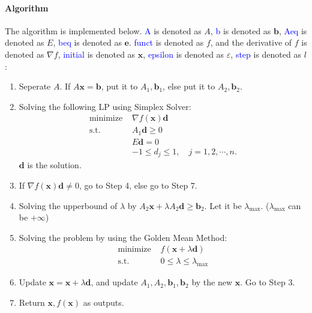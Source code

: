 \documentclass{article}
\begin{document}
\paragraph{Algorithm}
The algorithm is implemented below. \textcolor{blue}{A} is denoted as $A$, \textcolor{blue}{b} is denoted as $\mathbf{b}$, \textcolor{blue}{Aeq} is denoted as $E$, \textcolor{blue}{beq} is denoted as $\mathbf{e}$. \textcolor{blue}{funct} is denoted as $f$, and the derivative of $f$ is denoted as $\nabla f$, \textcolor{blue}{initial} is denoted as $\mathbf{x}$, \textcolor{blue}{epsilon} is denoted as $\varepsilon$, \textcolor{blue}{step} is denoted as $l$:
\begin{enumerate}
    \item Seperate $A$. If $A \mathbf{x} = \mathbf{b}$, put it to $A_1, \mathbf{b}_1$, else put it to $A_2, \mathbf{b}_2$.
    \item Solving the following LP using Simplex Solver:
    \begin{align*}
        \mbox{minimize } & \nabla f(\mathbf{x}) \mathbf{d} \\
        \mbox{s.t. } & A_1 \mathbf{d} \geqslant 0 \\
                     & E \mathbf{d} = 0 \\
                     & -1 \leqslant d_j \leqslant 1, \quad j = 1, 2, \cdots, n.
    \end{align*}
    $\mathbf{d}$ is the solution.
    \item If $\nabla f(\mathbf{x}) \mathbf{d} \neq 0$, go to Step 4, else go to Step 7.
    \item Solving the upperbound of $\lambda$ by $A_2 \mathbf{x} + \lambda A_2 \mathbf{d} \geqslant \mathbf{b}_2$. Let it be $\lambda_{\max}$. ($\lambda_{\max}$ can be $+\infty$)
    \item Solving the problem by using the Golden Mean Method:
    \begin{align*}
        \mbox{minimize } & f(\mathbf{x} + \lambda \mathbf{d}) \\
        \mbox{s.t.} & 0 \leqslant \lambda \leqslant \lambda_{\max} 
    \end{align*}
    \item Update $\mathbf{x} = \mathbf{x} + \lambda \mathbf{d}$, and update $A_1, A_2, \mathbf{b}_1, \mathbf{b}_2$ by the new $\mathbf{x}$. Go to Step 3.
    \item Return $\mathbf{x}, f(\mathbf{x})$ as outputs.
\end{enumerate}
\end{document}
